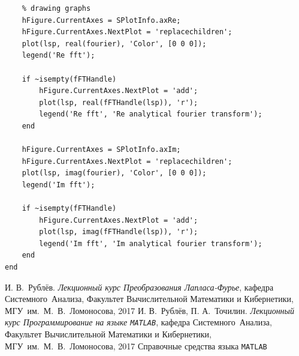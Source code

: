 \documentclass[11pt, oneside, draft]{article}
\numberwithin{equation}{section}
\begin{document}
\begin{verbatim}
    % drawing graphs
    hFigure.CurrentAxes = SPlotInfo.axRe;
    hFigure.CurrentAxes.NextPlot = 'replacechildren';
    plot(lsp, real(fourier), 'Color', [0 0 0]); 
    legend('Re fft');
 
    if ~isempty(fFTHandle) 
        hFigure.CurrentAxes.NextPlot = 'add';
        plot(lsp, real(fFTHandle(lsp)), 'r');
        legend('Re fft', 'Re analytical fourier transform');
    end

    hFigure.CurrentAxes = SPlotInfo.axIm;
    hFigure.CurrentAxes.NextPlot = 'replacechildren';
    plot(lsp, imag(fourier), 'Color', [0 0 0]);
    legend('Im fft');

    if ~isempty(fFTHandle) 
        hFigure.CurrentAxes.NextPlot = 'add';
        plot(lsp, imag(fFTHandle(lsp)), 'r');
        legend('Im fft', 'Im analytical fourier transform');
    end
end
    \end{verbatim}
    \begin{thebibliography}{0}
         И. В.~Рублёв. \emph{Лекционный курс Преобразования Лапласа-Фурье},
        кафедра Системного~Анализа, Факультет Вычислительной Математики и Кибернетики, МГУ~им.~М.~В.~Ломоносова, 
        2017
         И. В.~Рублёв, П. А.~Точилин. \emph{Лекционный курс Программирование на языке \texttt{MATLAB}},
        кафедра Системного~Анализа, Факультет Вычислительной Математики и Кибернетики, МГУ~им.~М.~В.~Ломоносова, 
        2017
         Справочные средства языка \texttt{MATLAB}
    \end{thebibliography}
\end{document}
